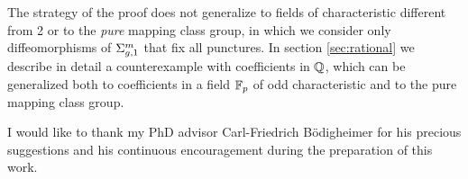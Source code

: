 

The strategy of the proof does not generalize to fields of characteristic different from 2 or to the \emph{pure}
mapping class group, in which we consider only diffeomorphisms of $\Sigma_{g,1}^m$ that fix all punctures. In section \ref{sec:rational}
we describe in detail a counterexample with coefficients in $\mathbb{Q}$, which can be generalized both to coefficients
in a field $\mathbb{F}_p$ of odd characteristic and to the pure mapping class group.

I would like to thank my PhD advisor Carl-Friedrich B\"odigheimer for his precious suggestions and his continuous encouragement
during the preparation of this work.